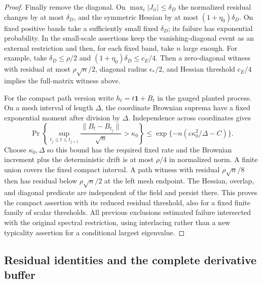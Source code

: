 \begin{proof}
Finally remove the diagonal.  On $\max_i|J_{ii}|\le\delta_D$ the
normalized residual changes by at most $\delta_D$, and the
symmetric Hessian by at most $(1+\eta_0)\delta_D$.
On fixed positive bands take a sufficiently small fixed $\delta_D$;
its failure has exponential probability.  In the small-scale
assertions keep the vanishing-diagonal event as an external
restriction and then, for each fixed band, take $n$ large enough.
For example, take \(\delta_D\le\rho/2\) and
\((1+\eta_0)\delta_D\le c_E/4\). Then a zero-diagonal
witness with residual at most \(\rho\sqrt n/2\), diagonal radius
\(\epsilon_*/2\), and Hessian threshold \(c_E/4\) implies the
full-matrix witness above.

For the compact path version write \(h_t=t\mathbf1+B_t\) in the
gauged planted process. On a mesh interval of length \(\Delta\),
the coordinate Brownian suprema have a fixed exponential moment
after division by \(\Delta\). Independence across coordinates gives
\[
 \Pr\!\left\{\sup_{t_j\le t\le t_{j+1}}
       \frac{\|B_t-B_{t_j}\|}{\sqrt n}>\kappa_0\right\}
 \le \exp\{-n(c\kappa_0^2/\Delta-C)\}.
\]
Choose \(\kappa_0,\Delta\) so this bound has the required fixed
rate and the Brownian increment plus the deterministic drift is
at most \(\rho/4\) in normalized norm. A finite union covers the
fixed compact interval. A path witness with residual
\(\rho\sqrt n/8\) then has residual below \(\rho\sqrt n/2\)
at the left mesh endpoint. The Hessian, overlap, and diagonal
predicate are independent of the field and persist there.
This proves the compact assertion with its reduced residual
threshold, also for a fixed finite family of scalar thresholds.
All previous exclusions estimated failure intersected with the
original spectral restriction, using interlacing rather than a
new typicality assertion for a conditional largest eigenvalue.
\end{proof}

\subsection{Residual identities and the complete derivative buffer}

